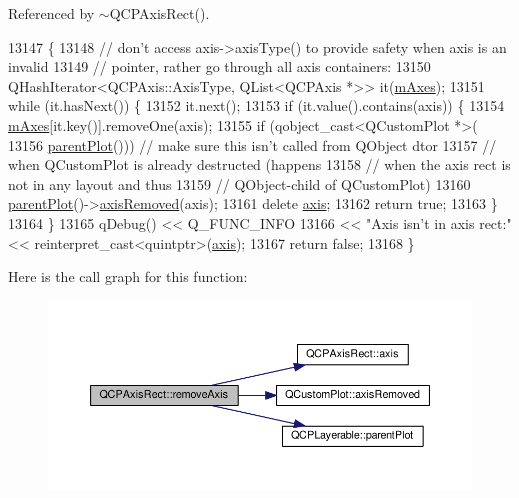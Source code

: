 Referenced by $\sim$\+Q\+C\+P\+Axis\+Rect().


\begin{DoxyCode}
13147                                           \{
13148   \textcolor{comment}{// don't access axis->axisType() to provide safety when axis is an invalid}
13149   \textcolor{comment}{// pointer, rather go through all axis containers:}
13150   QHashIterator<QCPAxis::AxisType, QList<QCPAxis *>> it(\hyperlink{class_q_c_p_axis_rect_ac2cb3ba9a25b733883afc3bd25f7d82b}{mAxes});
13151   \textcolor{keywordflow}{while} (it.hasNext()) \{
13152     it.next();
13153     \textcolor{keywordflow}{if} (it.value().contains(axis)) \{
13154       \hyperlink{class_q_c_p_axis_rect_ac2cb3ba9a25b733883afc3bd25f7d82b}{mAxes}[it.key()].removeOne(axis);
13155       \textcolor{keywordflow}{if} (qobject\_cast<QCustomPlot *>(
13156               \hyperlink{class_q_c_p_layerable_ab7e0e94461566093d36ffc0f5312b109}{parentPlot}())) \textcolor{comment}{// make sure this isn't called from QObject dtor}
13157                              \textcolor{comment}{// when QCustomPlot is already destructed (happens}
13158                              \textcolor{comment}{// when the axis rect is not in any layout and thus}
13159                              \textcolor{comment}{// QObject-child of QCustomPlot)}
13160         \hyperlink{class_q_c_p_layerable_ab7e0e94461566093d36ffc0f5312b109}{parentPlot}()->\hyperlink{class_q_custom_plot_a8b46607021c463c94709d3504951cb47}{axisRemoved}(axis);
13161       \textcolor{keyword}{delete} \hyperlink{class_q_c_p_axis_rect_a560de44e47a4af0f86c59102a094b1e4}{axis};
13162       \textcolor{keywordflow}{return} \textcolor{keyword}{true};
13163     \}
13164   \}
13165   qDebug() << Q\_FUNC\_INFO
13166            << \textcolor{stringliteral}{"Axis isn't in axis rect:"} << \textcolor{keyword}{reinterpret\_cast<}quintptr\textcolor{keyword}{>}(\hyperlink{class_q_c_p_axis_rect_a560de44e47a4af0f86c59102a094b1e4}{axis});
13167   \textcolor{keywordflow}{return} \textcolor{keyword}{false};
13168 \}
\end{DoxyCode}


Here is the call graph for this function\+:\nopagebreak
\begin{figure}[H]
\begin{center}
\leavevmode
\includegraphics[width=350pt]{class_q_c_p_axis_rect_a03c39cd9704f0d36fb6cf980cdddcbaa_cgraph}
\end{center}
\end{figure}




